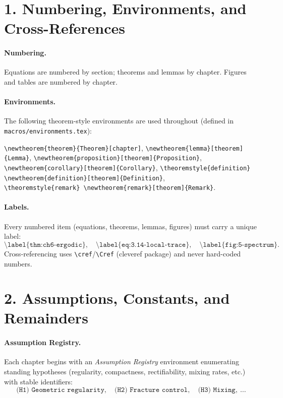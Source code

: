 \section*{1. Numbering, Environments, and Cross-References}

\paragraph{Numbering.}
Equations are numbered by section; theorems and lemmas by chapter. Figures and tables are numbered by chapter.

\paragraph{Environments.}
The following theorem-style environments are used throughout (defined in \texttt{macros/environments.tex}):
\begin{center}
\verb|\newtheorem{theorem}{Theorem}[chapter]|, \quad
\verb|\newtheorem{lemma}[theorem]{Lemma}|, \quad
\verb|\newtheorem{proposition}[theorem]{Proposition}|,\\
\verb|\newtheorem{corollary}[theorem]{Corollary}|, \quad
\verb|\theoremstyle{definition} \newtheorem{definition}[theorem]{Definition}|,\\
\verb|\theoremstyle{remark} \newtheorem{remark}[theorem]{Remark}|.
\end{center}

\paragraph{Labels.}
Every numbered item (equations, theorems, lemmas, figures) must carry a unique label:
\[
\texttt{\textbackslash label\{thm:ch6-ergodic\}},\quad
\texttt{\textbackslash label\{eq:3.14-local-trace\}},\quad
\texttt{\textbackslash label\{fig:5-spectrum\}}.
\]
Cross-referencing uses \verb|\cref|/\verb|\Cref| (cleveref package) and never hard-coded numbers.

\section*{2. Assumptions, Constants, and Remainders}

\paragraph{Assumption Registry.}
Each chapter begins with an \emph{Assumption Registry} environment enumerating standing hypotheses (regularity, compactness, rectifiability, mixing rates, etc.) with stable identifiers:
\[
\texttt{(H1) Geometric regularity},\quad \texttt{(H2) Fracture control},\quad \texttt{(H3) Mixing},\ \ldots
\]

